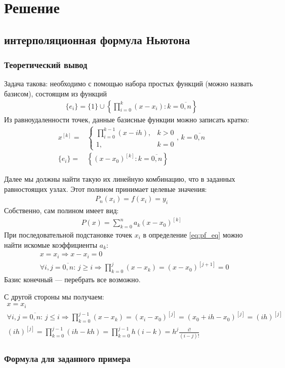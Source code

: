 \section{Решение}
\subsection{ интерполяционная формула Ньютона}
\subsubsection{Теоретический вывод}
Задача такова: необходимо с помощью набора простых функций (можно назвать базисом), состоящим из функций
\begin{align}
	\{e_i\}	= \{1\} \cup \left\{\prod_{i=0}^k (x - x_i)\colon k=\overline{0,n}\right\}
\end{align}
Из равноудаленности точек, данные базисные функции можно записать кратко:
\begin{align}
	x^{[k]} = & \begin{cases}
		            \prod_{i=0}^{k - 1} (x - i h), & k > 0 \\
		            1,                             & k = 0
	            \end{cases},\, k = \overline{0,n}                    \\
	\{e_i\} = & \left\{ (x - x_0)^{[k]}\colon k = \overline{0,n} \right\}
\end{align}

Далее мы должны найти такую их линейную комбинацию, что в заданных равностоящих узлах. Этот полином принимает целевые значения:
\begin{align}\label{eq:pf_eq}
	P_n(x_i) = f(x_i) = y_i
\end{align}
Собственно, сам полином имеет вид:
\begin{align}
	P(x) = \sum_{k=0}^n a_k (x - x_0)^{[k]}
\end{align}
При последовательной подстановке точек $x_i$ в определение \cref{eq:pf_eq} можно найти искомые коэффициенты $a_k$:
\begin{align}
	 & x = x_i \Longrightarrow x - x_i = 0                                                                           \\
	 & \forall i,j = \overline{0,n}\colon\, j \geq i \Longrightarrow \prod_{k=0}^j (x - x_k) = (x - x_0)^{[j+1]} = 0
\end{align}
Базис конечный --- перебрать все возможно.

С другой стороны мы получаем:
\begin{align}
	x            = x_i                   \\
	\forall i,j  = \overline{0,n}\colon\, j \leq i \Longrightarrow \prod_{k=0}^{j-1} (x - x_k)  = (x_i - x_0)^{[j]} =
	(x_0 + i h - x_0)^{[j]} = (ih)^{[j]} \\
	(ih)^{[j]} = \prod_{k=0}^{j-1} (ih - kh) = \prod_{k=0}^{j-1} h (i - k) = h^j \frac{i!}{(i-j)!}
\end{align}

\subsubsection{Формула для заданного примера}


